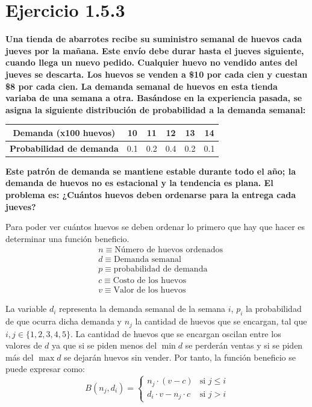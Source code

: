 \documentclass[12pt, letterpaper]{article}
\title{\doctitle}
\author{Juan Luis Serradilla Tormos}
\date{\monthname[\month] de \the\year}
\begin{document}
\pagestyle{fancy}

\maketitle

\newpage
\tableofcontents

\newpage
\section{Ejercicio 1.5.3}
\textbf{Una tienda de abarrotes recibe su suministro semanal de
huevos cada jueves por la mañana. Este envío debe durar hasta el jueves
siguiente, cuando llega un nuevo pedido. Cualquier huevo no vendido antes
del jueves se descarta. Los huevos se venden a \$10 por cada cien y cuestan
\$8 por cada cien. La demanda semanal de huevos en esta tienda variaba de una
semana a otra. Basándose en la experiencia pasada, se asigna la siguiente
distribución de probabilidad a la demanda semanal:}
\begin{table}[h]
    \centering
    \begin{tabular}{cccccc}
        \toprule
        \textbf{Demanda (x100 huevos)} & 10 & 11 & 12 & 13 & 14 \\
        \midrule
        \textbf{Probabilidad de demanda} & 0.1 & 0.2 & 0.4 & 0.2 & 0.1 \\
        \bottomrule
    \end{tabular}
\end{table}
\textbf{Este patrón de demanda se mantiene estable durante todo el año; la
demanda de huevos no es estacional y la tendencia es plana. El problema
es: ¿Cuántos huevos deben ordenarse para la entrega cada jueves?}

Para poder ver cuántos huevos se deben ordenar lo primero que hay que hacer es determinar una función beneficio.
\begin{align*}
    & n \equiv \text{Número de huevos ordenados} \\ 
    & d \equiv \text{Demanda semanal} \\
    & p \equiv \text{probabilidad de demanda} \\
    & c \equiv \text{Costo de los huevos} \\
    & v \equiv \text{Valor de los huevos} 
\end{align*}

La variable $d_i$ representa la demanda semanal de la semana $i$, $p_i$ la probabilidad de que ocurra dicha demanda y $n_j$  la cantidad de huevos que se encargan, tal que $i,j \in \{1,2,3,4,5\}$. La cantidad de huevos que se encargan oscilan entre los valores de $d$ ya que si se piden menos del $\min{d}$ se perderán ventas y si se piden más del $\max{d}$ se dejarán huevos sin vender. Por tanto, la función beneficio se puede expresar como:
\[
    B(n_j,d_i) = \begin{cases}
        n_j \cdot (v - c) & \text{si } j \leq i \\
        d_i \cdot v - n_j \cdot c & \text{si } j > i
    \end{cases}
\]
\end{document}
